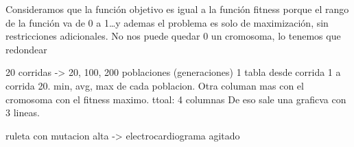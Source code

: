 Consideramos que la función objetivo es igual a la función fitness porque el rango de la función va de 0 a 1\dots y ademas el problema es solo de maximización, sin restricciones adicionales.
No nos puede quedar 0 un cromosoma, lo tenemos que redondear

20 corridas -> 20, 100, 200 poblaciones (generaciones)
1 tabla desde corrida 1 a corrida 20. min, avg, max de cada poblacion. Otra columan mas con el cromosoma con el fitness maximo. ttoal: 4 columnas
De eso sale una graficva con 3 lineas.

ruleta con mutacion alta -> electrocardiograma agitado
